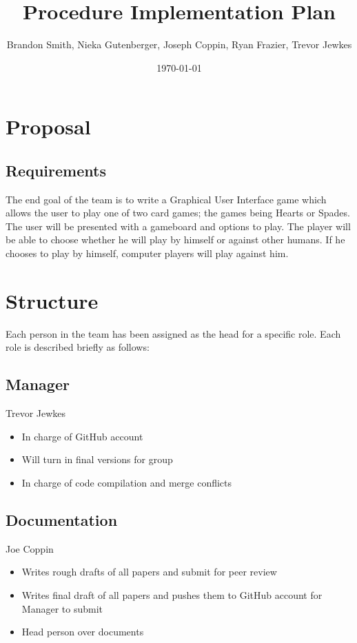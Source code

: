 \documentclass[11pt, titlepage]{article}
\author{Brandon Smith, Nieka Gutenberger, Joseph Coppin, Ryan Frazier, Trevor Jewkes}
\title{Procedure Implementation Plan}
\date{\today}
\begin{document}
	\maketitle
    \setcounter{tocdepth}{1}
\section{Proposal}

    \subsection{Requirements}

    The end goal of the team is to write a Graphical User Interface game which allows the user to play one of two card games; the games being Hearts or Spades.  The user will be presented with a gameboard and options to play. The player will be able to choose whether he will play by himself or against other humans.  If he chooses to play by himself, computer players will play against him.

    \section{Structure}
    	Each person in the team has been assigned as the head for a specific role. Each role is described briefly as follows:

    	\subsection{Manager}
	    Trevor Jewkes
    	\begin{itemize}
    		\item In charge of GitHub account
    		\item Will turn in final versions for group
    		\item In charge of code compilation and merge conflicts
    	\end{itemize}

    \subsection{Documentation}
	    Joe Coppin
    	\begin{itemize}
    		\item Writes rough drafts of all papers and submit for peer review
    		\item Writes final draft of all papers and pushes them to GitHub account for Manager to submit
    		\item Head person over documents
    	\end{itemize}
\end{document}
